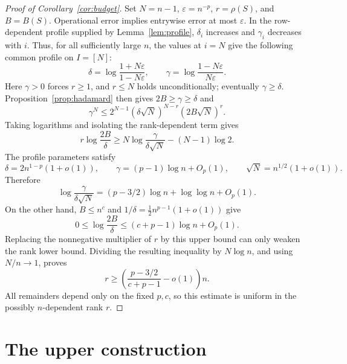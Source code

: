 \documentclass[10pt]{article} %
\theoremstyle{definition}
\begin{document}
\begin{proof}[Proof of Corollary~\ref{cor:budget}]
Set \(N=n-1\), \(\varepsilon=n^{-p}\), \(r=\rho(S)\), and \(B=B(S)\).
Operational error implies entrywise error at most \(\varepsilon\).  In the
row-dependent profile supplied by Lemma~\ref{lem:profile}, \(\delta_i\)
increases and \(\gamma_i\) decreases with \(i\).  Thus, for all sufficiently
large \(n\), the values at \(i=N\) give the following common profile on
\(I=[N]\):
\[
 \delta=\log\frac{1+N\varepsilon}{1-N\varepsilon},\qquad
 \gamma=\log\frac{1-N\varepsilon}{N\varepsilon}.
\]
Here \(\gamma>0\) forces \(r\ge1\), and
\(r\le N\) holds unconditionally; eventually \(\gamma\ge\delta\).
Proposition~\ref{prop:hadamard} then gives \(2B\ge\gamma\ge\delta\) and
\[
 \gamma^N\le
 2^{N-1}(\delta\sqrt N)^{N-r}(2B\sqrt N)^r .
\]
Taking logarithms and isolating the rank-dependent term gives
\[
 r\log\frac{2B}{\delta}
 \ge N\log\frac{\gamma}{\delta\sqrt N}-(N-1)\log2.
\]
The profile parameters satisfy
\[
 \delta=2n^{1-p}(1+o(1)),\qquad
 \gamma=(p-1)\log n+O_p(1),\qquad
 \sqrt N=n^{1/2}(1+o(1)).
\]
Therefore
\[
 \log\frac{\gamma}{\delta\sqrt N}
 =(p-3/2)\log n+\log\log n+O_p(1).
\]
On the other hand, \(B\le n^c\) and
\(1/\delta=\tfrac12n^{p-1}(1+o(1))\) give
\[
 0\le\log\frac{2B}{\delta}
 \le(c+p-1)\log n+O_p(1).
\]
Replacing the nonnegative multiplier of \(r\) by this upper bound can only
weaken the rank lower bound.  Dividing the resulting inequality by
\(N\log n\), and using \(N/n\to1\), proves
\[
 r\ge\left(\frac{p-3/2}{c+p-1}-o(1)\right)n.
\]
All remainders depend only on the fixed \(p,c\), so this estimate is uniform
in the possibly \(n\)-dependent rank \(r\).
\end{proof}

\section{The upper construction}\label{app:construction}
\end{document}
